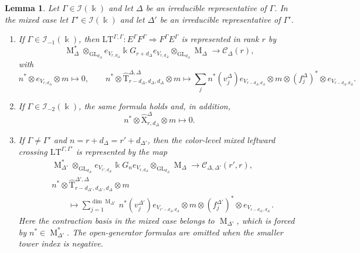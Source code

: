 \documentclass[12pt]{amsart}
\numberwithin{itemcounter}{subsection}
\theoremstyle{plain}
\newtheorem{lemma}[theorem]{Lemma}
\theoremstyle{definition}
\theoremstyle{remark}
\numberwithin{equation}{section}
\def\k{\Bbbk}
\def\calI{\mathcal{I}}
\def\GL{\mathrm{GL}}
\def\M{{\operatorname{M}\nolimits}}
\def\Lcross{\mathrm{LT}}
\DeclareMathOperator*{\ot}{\otimes}
\begin{document}
\begin{lemma}\label{Lem:Rcrossing}
Let \(\Gamma\in\calI(\k)\) and let \(\Delta\) be an irreducible representative of \(\Gamma\).  In the mixed
case let \(\Gamma'\in\calI(\k)\) and let \(\Delta'\) be an irreducible representative of \(\Gamma'\).
\begin{enumerate}
\item[(a)] If \(\Gamma\in\calI_{-1}(\k)\), then
\(\Lcross^{\Gamma,\Gamma}:E^\Gamma F^\Gamma\Rightarrow F^\Gamma E^\Gamma\)
is represented in rank \(r\) by
\[
\M_\Delta^*\ot_{\GL_{d_\Delta}}e_{V_{r,d_\Delta}}
\k G_{r+d_\Delta}e_{V_{r,d_\Delta}}
\ot_{\GL_{d_\Delta}}\M_\Delta
\longrightarrow \mathscr C_\Delta(r),
\]
with
\[
n^*\otimes e_{V_{r,d_\Delta}}\otimes m\longmapsto0,
\qquad
n^*\otimes\widehat{\mathrm{T}}^{\Delta,\Delta}_{r-d_\Delta,d_\Delta,d_\Delta}
\otimes m
\longmapsto
\sum_j n^*(v_j^\Delta)e_{V_{r-d_\Delta,d_\Delta}}
\otimes m\otimes(f_j^\Delta)^*\otimes
 e_{V_{r-d_\Delta,d_\Delta}}.
\]
\item[(b)] If \(\Gamma\in\calI_{-2}(\k)\), the same formula holds and, in
addition,
\[
n^*\otimes\widehat{\mathrm{X}}^\Delta_{r,d_\Delta}\otimes m\longmapsto0.
\]
\item[(c)] If \(\Gamma\ne\Gamma'\) and
\(n=r+d_\Delta=r'+d_{\Delta'}\), then the color-level mixed leftward crossing
\(\Lcross^{\Gamma,\Gamma'}\) is represented by the map
\begin{align*}
&\M_{\Delta'}^*\ot_{\GL_{d_{\Delta'}}}e_{V_{r',d_{\Delta'}}}
 \k G_n e_{V_{r,d_\Delta}}\ot_{\GL_{d_\Delta}}\M_\Delta
 \longrightarrow \mathscr C_{\Delta,\Delta'}(r',r),\\
&n^*\otimes
 \widehat{\mathrm{T}}^{\Delta',\Delta}_{r-d_{\Delta'},d_{\Delta'},d_\Delta}
 \otimes m\\
&\qquad\longmapsto
\sum_{j=1}^{\dim\M_{\Delta'}}
 n^*(v_j^{\Delta'})e_{V_{r'-d_\Delta,d_\Delta}}
 \otimes m\otimes(f_j^{\Delta'})^*
 \otimes e_{V_{r-d_{\Delta'},d_{\Delta'}}}.
\end{align*}
Here the contraction basis in the mixed case belongs to \(\M_{\Delta'}\),
which is forced by \(n^*\in\M_{\Delta'}^*\).  The open-generator formulas
are omitted when the smaller tower index is negative.
\end{enumerate}
\end{lemma}
\end{document}
